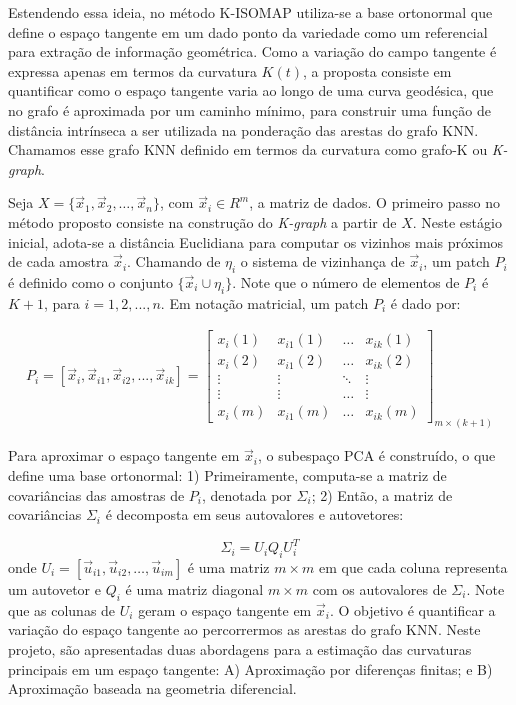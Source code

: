 \documentclass[a4paper,12pt]{article}
\begin{document}
Estendendo essa ideia, no método K-ISOMAP utiliza-se a base ortonormal que define o espaço tangente em um dado ponto da variedade como um referencial para extração de informação geométrica. Como a variação do campo tangente é expressa apenas em termos da curvatura $K(t)$, a proposta consiste em quantificar como o espaço tangente varia ao longo de uma curva geodésica, que no grafo é aproximada por um caminho mínimo, para construir uma função de distância intrínseca a ser utilizada na ponderação das arestas do grafo KNN. Chamamos esse grafo KNN definido em termos da curvatura como grafo-K ou \emph{K-graph}.

Seja $X = \{ \vec{x}_1 , \vec{x}_2 , \ldots, \vec{x}_n \}$, com $\vec{x}_i \in R^m$, a matriz de dados. O primeiro passo no método proposto consiste na construção do \emph{K-graph} a partir de $X$. Neste estágio inicial, adota-se a distância Euclidiana para computar os vizinhos mais próximos de cada amostra $\vec{x}_i$. Chamando de $\eta_i$ o sistema de vizinhança de $\vec{x}_i$, um patch $P_i$ é definido como o conjunto $\{ \vec{x}_i \cup \eta_i \}$. Note que o número de elementos de $P_i$ é $K+1$, para $i = 1, 2, ..., n$. Em notação matricial, um patch $P_i$ é dado por:

\begin{align}
	P_i  = \left[ \vec{x}_i , \vec{x}_{i1} , \vec{x}_{i2} , ... , \vec{x}_{ik} \right]  
		 = \begin{bmatrix}	
				x_i(1) & x_{i1}(1) & \ldots & x_{ik}(1)  \\ 
				x_i(2) & x_{i1}(2) & \ldots & x_{ik}(2) \\
				\vdots & \vdots & \ddots & \vdots  \\
				\vdots & \vdots & \ldots & \vdots  \\
				x_i(m) & x_{i1}(m) & \ldots & x_{ik}(m) 
		\end{bmatrix}_{m \times (k+1)}
\end{align} 

Para aproximar o espaço tangente em $\vec{x}_i$, o subespaço PCA é construído, o que define uma base ortonormal: 1) Primeiramente, computa-se a matriz de covariâncias das amostras de $P_i$, denotada por $\Sigma_i$; 2) Então, a matriz de covariâncias $\Sigma_i$ é decomposta em seus autovalores e autovetores:

\begin{equation}
	\Sigma_i = U_i Q_i U_i^T
\end{equation} onde $U_i = [\vec{u}_{i1}, \vec{u}_{i2}, \ldots, \vec{u}_{im}]$ é uma matriz $m \times m$ em que cada coluna representa um autovetor e $Q_i$ é uma matriz diagonal $m \times m$ com os autovalores de $\Sigma_i$. Note que as colunas de $U_i$ geram o espaço tangente em $\vec{x}_i$. O objetivo é quantificar a variação do espaço tangente ao percorrermos as arestas do grafo KNN. Neste projeto, são apresentadas duas abordagens para a estimação das curvaturas principais em um espaço tangente: A) Aproximação por diferenças finitas; e B) Aproximação baseada na geometria diferencial.
\end{document}
